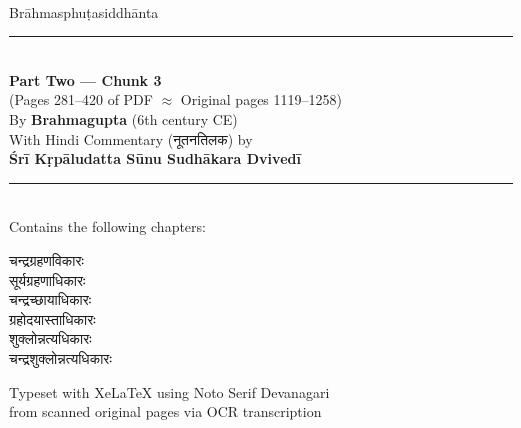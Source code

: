 \documentclass[11pt,a4paper]{article}
\newcommand{\dev}[1]{{\devanagarifont #1}}
\begin{document}
\begin{titlepage}
\begin{center}
\vspace*{2cm}

{\fontsize{24}{28}\selectfont\color{titlecolor}\dev{ब्राह्मस्फुटसिद्धान्तः}}\\[0.8cm]
{\fontsize{18}{22}\selectfont\color{sectioncolor} Brāhmasphuṭasiddhānta}\\[1.5cm]

\rule{0.6\textwidth}{1pt}\\[0.8cm]

{\Large\textbf{Part Two — Chunk 3}}\\[0.3cm]
{\large (Pages 281--420 of PDF $\approx$ Original pages 1119--1258)}\\[1.5cm]

{\large By \textbf{Brahmagupta} (6th century CE)}\\[0.5cm]
{\large With Hindi Commentary (}\dev{नूतनतिलक}{\large ) by}\\[0.2cm]
{\large \textbf{Śrī Kṛpāludatta Sūnu Sudhākara Dvivedī}}\\[2cm]

\rule{0.6\textwidth}{0.4pt}\\[0.8cm]

{\normalsize Contains the following chapters:}\\[0.3cm]
\begin{minipage}{0.7\textwidth}
\begin{center}
\dev{चन्द्रग्रहणविकारः}\\[0.1cm]
\dev{सूर्यग्रहणाधिकारः}\\[0.1cm]
\dev{चन्द्रच्छायाधिकारः}\\[0.1cm]
\dev{ग्रहोदयास्ताधिकारः}\\[0.1cm]
\dev{शुक्लोन्नत्यधिकारः}\\[0.1cm]
\dev{चन्द्रशुक्लोन्नत्यधिकारः}\\[0.1cm]
\end{center}
\end{minipage}

\vfill
{\small Typeset with XeLaTeX using Noto Serif Devanagari}\\
{\small from scanned original pages via OCR transcription}

\end{center}
\end{titlepage}
\end{document}
